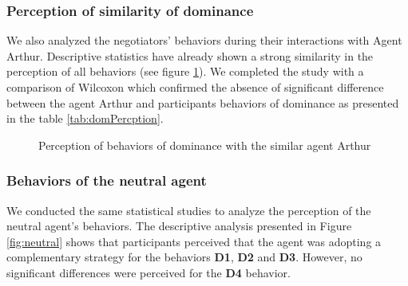 \documentclass[10pt, a4paper, twocolumn]{article} %
\begin{document}
		\subsubsection{Perception of similarity of dominance}
		
		We also analyzed the negotiators' behaviors during their interactions with Agent Arthur. Descriptive statistics have already shown a strong similarity in the perception of all behaviors (see figure \ref{fig:sim}). We completed the study with a comparison of Wilcoxon which confirmed the absence of significant difference between the agent Arthur and  participants behaviors of dominance as presented in the table \ref{tab:domPercption}.  
		
			\begin{figure}[!tb]
				\centering
				
				\caption{Perception of behaviors of dominance  with the similar agent Arthur}
				\label{fig:sim}
			\end{figure}
			
		\subsubsection{Behaviors of the neutral agent}
		
		We conducted the same statistical studies to analyze the perception of the neutral agent's behaviors. The descriptive analysis presented in Figure \ref{fig:neutral} shows that participants perceived that the agent was adopting a complementary strategy for the behaviors \textbf{D1}, \textbf{D2} and \textbf{D3}. However, no significant differences were perceived for the \textbf{D4} behavior.
		
\end{document}
